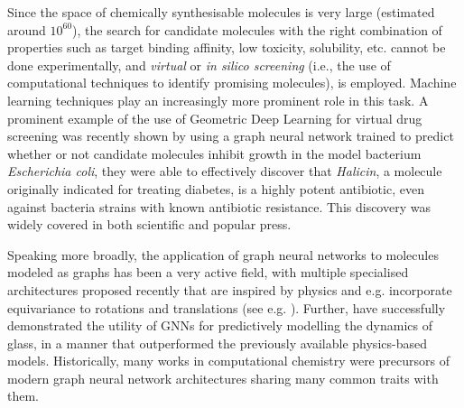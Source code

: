 Since the space of chemically synthesisable molecules is very large (estimated around $10^{60}$), the search for candidate molecules with the right combination of properties such as target binding affinity, low toxicity, solubility, etc. cannot be done experimentally, and {\em virtual} or {\em in silico screening} (i.e., the use of computational techniques to identify promising molecules), is employed. Machine learning techniques play an increasingly more prominent role in this task. 
%
%
A prominent example of the use of Geometric Deep Learning for virtual drug screening was recently shown by \citet{stokes2020deep} %
using a graph neural network trained to predict whether or not candidate molecules inhibit growth in the model bacterium \emph{Escherichia coli}, they were able to effectively discover that \emph{Halicin}, a molecule originally indicated for treating diabetes, is a highly potent antibiotic, even against bacteria strains with known antibiotic resistance.  This discovery was widely covered in both scientific and popular press. 


Speaking more broadly, the application of graph neural networks to molecules modeled as graphs has been a very active field, with multiple specialised architectures proposed recently that are inspired by physics and e.g. incorporate equivariance to rotations and translations (see e.g. \cite{thomas2018tensor,anderson2019cormorant,fuchs2020se,satorras2021n}). Further, \citet{bapst2020unveiling} have successfully demonstrated the utility of GNNs for predictively modelling the dynamics of glass, in a manner that outperformed the previously available physics-based models.
%
Historically, many works in computational chemistry were precursors of modern graph neural network architectures sharing many common traits with them. 




